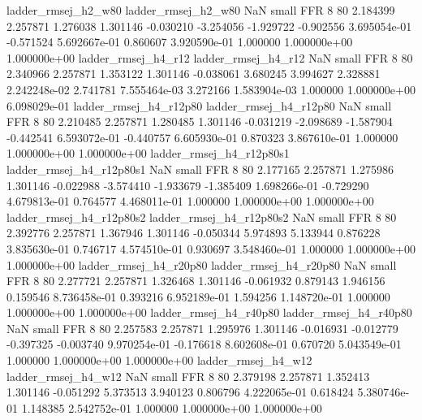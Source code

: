      ladder_rmsej_h2_w80      ladder_rmsej_h2_w80                   NaN      small      FFR                 8 80 2.184399       2.257871 1.276038       1.301146   -0.030210     -3.254056     -1.929722    -0.902556   3.695054e-01 -0.571524 5.692667e-01     0.860607   3.920590e-01            1.000000    1.000000e+00        1.000000e+00
     ladder_rmsej_h4_r12      ladder_rmsej_h4_r12                   NaN      small      FFR                 8 80 2.340966       2.257871 1.353122       1.301146   -0.038061      3.680245      3.994627     2.328881   2.242248e-02  2.741781 7.555464e-03     3.272166   1.583904e-03            1.000000    1.000000e+00        6.098029e-01
  ladder_rmsej_h4_r12p80   ladder_rmsej_h4_r12p80                   NaN      small      FFR                 8 80 2.210485       2.257871 1.280485       1.301146   -0.031219     -2.098689     -1.587904    -0.442541   6.593072e-01 -0.440757 6.605930e-01     0.870323   3.867610e-01            1.000000    1.000000e+00        1.000000e+00
ladder_rmsej_h4_r12p80s1 ladder_rmsej_h4_r12p80s1                   NaN      small      FFR                 8 80 2.177165       2.257871 1.275986       1.301146   -0.022988     -3.574410     -1.933679    -1.385409   1.698266e-01 -0.729290 4.679813e-01     0.764577   4.468011e-01            1.000000    1.000000e+00        1.000000e+00
ladder_rmsej_h4_r12p80s2 ladder_rmsej_h4_r12p80s2                   NaN      small      FFR                 8 80 2.392776       2.257871 1.367946       1.301146   -0.050344      5.974893      5.133944     0.876228   3.835630e-01  0.746717 4.574510e-01     0.930697   3.548460e-01            1.000000    1.000000e+00        1.000000e+00
  ladder_rmsej_h4_r20p80   ladder_rmsej_h4_r20p80                   NaN      small      FFR                 8 80 2.277721       2.257871 1.326468       1.301146   -0.061932      0.879143      1.946156     0.159546   8.736458e-01  0.393216 6.952189e-01     1.594256   1.148720e-01            1.000000    1.000000e+00        1.000000e+00
  ladder_rmsej_h4_r40p80   ladder_rmsej_h4_r40p80                   NaN      small      FFR                 8 80 2.257583       2.257871 1.295976       1.301146   -0.016931     -0.012779     -0.397325    -0.003740   9.970254e-01 -0.176618 8.602608e-01     0.670720   5.043549e-01            1.000000    1.000000e+00        1.000000e+00
     ladder_rmsej_h4_w12      ladder_rmsej_h4_w12                   NaN      small      FFR                 8 80 2.379198       2.257871 1.352413       1.301146   -0.051292      5.373513      3.940123     0.806796   4.222065e-01  0.618424 5.380746e-01     1.148385   2.542752e-01            1.000000    1.000000e+00        1.000000e+00
